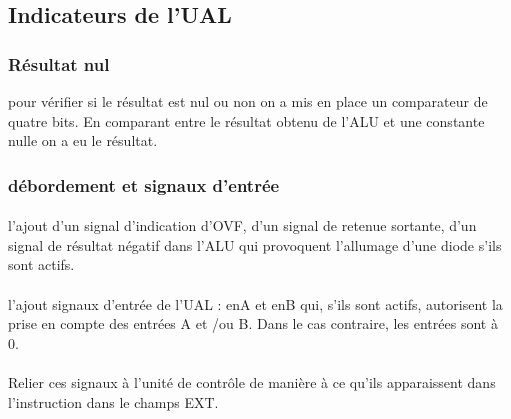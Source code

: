 
\subsection{Indicateurs de l’UAL} 
\label{sec:Indicateurs}

\subsubsection{Résultat nul}
\label{sec:nul}

pour vérifier si le résultat est nul ou non on a mis en place un comparateur de quatre bits. En comparant entre le résultat obtenu de l'ALU et une constante nulle on a eu le résultat.
\newpage



\subsubsection{débordement et signaux d'entrée}
\label{sec:deb}

\paragraph{} l'ajout d’un signal d’indication d’OVF, d’un signal de retenue sortante, d’un signal de résultat négatif dans l’ALU  qui  provoquent  l’allumage  d’une  diode  s’ils  sont  actifs.

\paragraph{} l'ajout signaux d’entrée de l’UAL : enA et enB qui, s’ils sont actifs, autorisent la prise en compte des entrées A et
/ou B. Dans le cas contraire, les entrées sont à 0.

\paragraph{} Relier ces signaux à l’unité de contrôle de manière à ce qu’ils apparaissent dans l’instruction dans le champs 
EXT.

